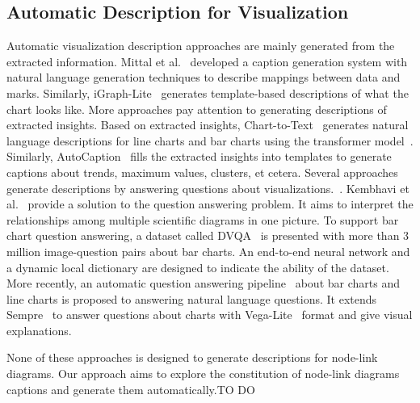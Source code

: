 \subsection{Automatic Description for Visualization}
Automatic visualization description approaches are mainly generated from the extracted information. 
Mittal et al.~\cite{DBLP:journals/coling/MittalMCR98} developed a caption generation system with natural language generation techniques to describe mappings between data and marks.
Similarly, iGraph-Lite~\cite{DBLP:journals/tochi/FerresLST13} generates template-based descriptions of what the chart looks like.
More approaches pay attention to generating descriptions of extracted insights.
Based on extracted insights, Chart-to-Text~\cite{DBLP:conf/inlg/ObeidH20} generates natural language descriptions for line charts and bar charts using the transformer model~\cite{DBLP:conf/nips/VaswaniSPUJGKP17}. 
Similarly, AutoCaption~\cite{DBLP:conf/apvis/LiuXHWY20} fills the extracted insights into templates to generate captions about trends, maximum values, clusters, et cetera. 
Several approaches generate descriptions by answering questions about visualizations.~\cite{DBLP:conf/cvpr/KaflePCK18, DBLP:conf/chi/KimHA20, DBLP:conf/eccv/KembhaviSKSHF16}.
Kembhavi et al.~\cite{DBLP:conf/eccv/KembhaviSKSHF16} provide a solution to the question answering problem. 
It aims to interpret the relationships among multiple scientific diagrams in one picture. 
To support bar chart question answering, a dataset called DVQA~\cite{DBLP:conf/cvpr/KaflePCK18} is presented with more than 3 million image-question pairs about bar charts. 
An end-to-end neural network and a dynamic local dictionary are designed to indicate the ability of the dataset.
More recently, an automatic question answering pipeline~\cite{DBLP:conf/chi/KimHA20} about bar charts and line charts is proposed to answering natural language questions. It extends Sempre~\cite{DBLP:conf/acl/PasupatL15, DBLP:conf/emnlp/ZhangPL17} to answer questions about charts with Vega-Lite~\cite{DBLP:journals/tvcg/SatyanarayanMWH17} format and give visual explanations.

None of these approaches is designed to generate descriptions for node-link diagrams. Our approach aims to explore the constitution of node-link diagrams captions and generate them automatically.{\colorbox{text-highlight}{TO DO}} %